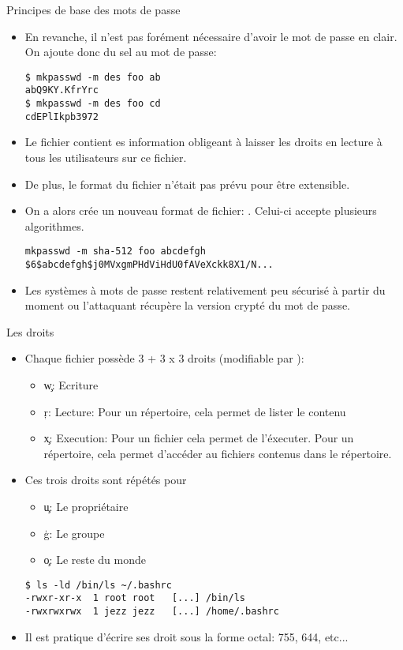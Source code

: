 \begin{frame}[fragile=singleslide]{Principes de base des mots de passe}
\begin{itemize} 
\item En revanche, il n'est  pas forément nécessaire d'avoir le mot de
  passe en clair. On ajoute donc du sel au mot de passe:
\begin{lstlisting} 
$ mkpasswd -m des foo ab
abQ9KY.KfrYrc
$ mkpasswd -m des foo cd
cdEPlIkpb3972
\end{lstlisting} 
\item Le fichier   contient es information obligeant
  à  laisser les  droits en  lecture à  tous les  utilisateurs  sur ce
  fichier.
\item  De plus, le  format du  fichier   n'était pas
  prévu pour être extensible.
\item   On   a   alors    crée   un   nouveau   format   de   fichier:
  .  Celui-ci accepte plusieurs algorithmes.
\begin{lstlisting} 
mkpasswd -m sha-512 foo abcdefgh
$6$abcdefgh$j0MVxgmPHdViHdU0fAVeXckk8X1/N...
\end{lstlisting}
\item Les systèmes à mots de passe restent relativement peu sécurisé à
  partir du moment ou l'attaquant récupère la version crypté du mot de
  passe.
\end{itemize} 
\end{frame}

\begin{frame}[fragile=singleslide]{Les droits}
  \begin{itemize}
  \item  Chaque fichier  possède  3 +  3  x 3  droits (modifiable  par
    ):
    \begin{itemize}
    \item \c{w}: Ecriture
    \item \c{r}: Lecture: Pour un répertoire, cela permet de lister le contenu
    \item \c{x}: Execution: Pour un fichier cela permet de
      l'éxecuter. Pour un répertoire, cela permet d'accéder au
      fichiers contenus dans le répertoire.
    \end{itemize}
  \item Ces trois droits sont répétés pour
    \begin{itemize}
    \item \c{u}: Le propriétaire
    \item \c{g}: Le groupe
    \item \c{o}: Le reste du monde
    \end{itemize}
    \begin{lstlisting}[columns=fixed]
$ ls -ld /bin/ls ~/.bashrc
-rwxr-xr-x  1 root root   [...] /bin/ls
-rwxrwxrwx  1 jezz jezz   [...] /home/.bashrc
    \end{lstlisting}
  \item Il est  pratique d'écrire ses droit sous  la forme octal: 755,
    644, etc...
  \end{itemize}
\end{frame}

